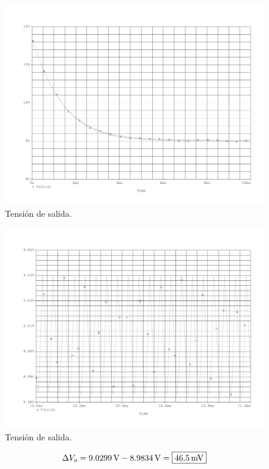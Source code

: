 
\begin{figure}[H]
	\centering
	\includegraphics[scale=0.5]{Figuras/ej1_vo.pdf}
	\caption{Tensión de salida.}
	\label{fig:sim_ej1_vo}
\end{figure}

\begin{figure}[H]
	\centering
	\includegraphics[scale=0.5]{Figuras/ej1_vo_zoom.pdf}
	\caption{Tensión de salida.}
	\label{fig:sim_ej1_vo_zoom}
\end{figure}

\begin{equation}
	\centering
	\Delta V_o = \SI{9.0299}{\volt} - \SI{8.9834}{\volt} = \boxed{\SI{46.5}{\milli\volt}}
	\label{ec:riz2}
\end{equation}

